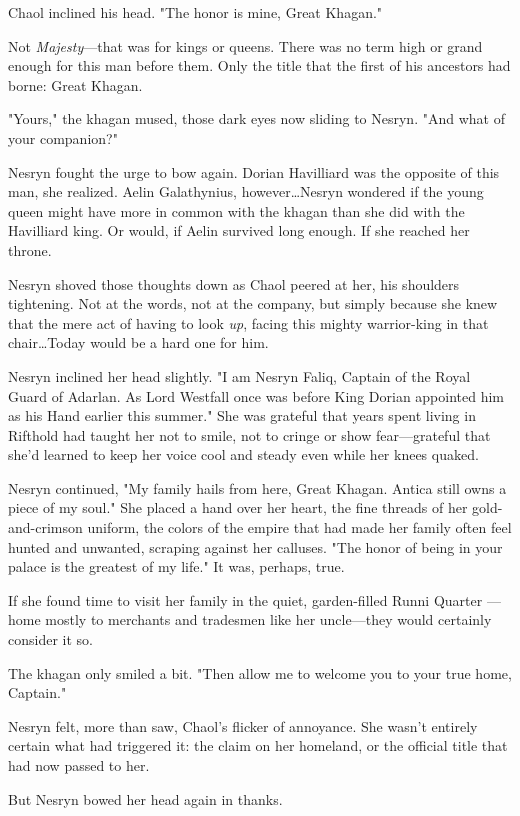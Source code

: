 Chaol inclined his head.
"The honor is mine, Great Khagan."

Not \emph{Majesty}---that was for kings or queens.
There was no term high or grand enough for this man before them.
Only the title that the first of his ancestors had borne: Great Khagan.

"Yours," the khagan mused, those dark eyes now sliding to Nesryn.
"And what of your companion?"

Nesryn fought the urge to bow again.
Dorian Havilliard was the opposite of this man, she realized.
Aelin Galathynius, however\ldots Nesryn wondered if the young queen might have more in common with the khagan than she did with the Havilliard king.
Or would, if Aelin survived long enough.
If she reached her throne.

Nesryn shoved those thoughts down as Chaol peered at her, his shoulders tightening.
Not at the words, not at the company, but simply because she knew that the mere act of having to look \emph{up}, facing this mighty warrior-king in that chair\ldots Today would be a hard one for him.

Nesryn inclined her head slightly.
"I am Nesryn Faliq, Captain of the Royal Guard of Adarlan.
As Lord Westfall once was before King Dorian appointed him as his Hand earlier this summer."
She was grateful that years spent living in Rifthold had taught her not to smile, not to cringe or show fear---grateful that she'd learned to keep her voice cool and steady even while her knees quaked.

Nesryn continued, "My family hails from here, Great Khagan.
Antica still owns a piece of my soul."
She placed a hand over her heart, the fine threads of her gold-and-crimson uniform, the colors of the empire that had made her family often feel hunted and unwanted, scraping against her calluses.
"The honor of being in your palace is the greatest of my life."
It was, perhaps, true.

If she found time to visit her family in the quiet, garden-filled Runni Quarter ---home mostly to merchants and tradesmen like her uncle---they would certainly consider it so.

The khagan only smiled a bit.
"Then allow me to welcome you to your true home, Captain."

Nesryn felt, more than saw, Chaol's flicker of annoyance.
She wasn't entirely certain what had triggered it: the claim on her homeland, or the official title that had now passed to her.

But Nesryn bowed her head again in thanks.

